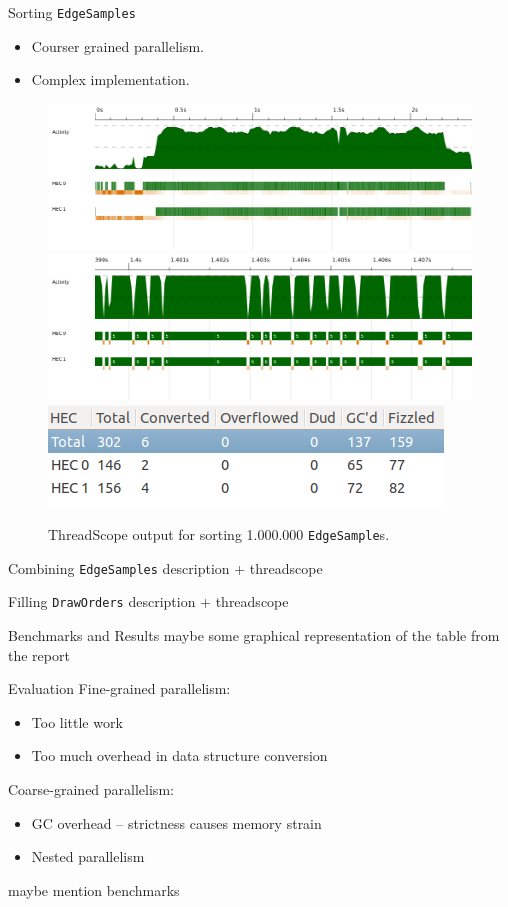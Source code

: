 \documentclass[slidestop,compress,mathserif, xcolor=table]{beamer}
\begin{document}
\begin{frame}[c]{Sorting \texttt{EdgeSamples}}
  \begin{itemize}
  \item Courser grained parallelism.
  \item Complex implementation.
  \end{itemize}
 \begin{figure}[h!]
  \centering
  \includegraphics[width=0.6\linewidth,trim={4cm 2cm 0 0},clip]{../threadscope/sorting/sorting-final}
  \includegraphics[width=0.3\linewidth,trim={8cm 2cm 5cm 0},clip]{../threadscope/sorting/sorting-final-zoom}
  \includegraphics[width=0.25\linewidth]{../threadscope/sorting/sorting-final-sparks}
  \caption{ThreadScope output for sorting 1.000.000 \texttt{EdgeSample}s.}
  \label{fig:sorting-thread}
\end{figure}

\end{frame}

\begin{frame}[c]{Combining \texttt{EdgeSamples}}
description + threadscope
\end{frame}

\begin{frame}[c]{Filling \texttt{DrawOrders}}
description + threadscope
\end{frame}

\begin{frame}[c]{Benchmarks and Results}
maybe some graphical representation of the table from the report
\end{frame}

\begin{frame}[c]{Evaluation}
Fine-grained parallelism:
\begin{itemize}
\item Too little work
\item Too much overhead in data structure conversion
\end{itemize}
\bigskip

Coarse-grained parallelism:
\begin{itemize}
\item GC overhead -- strictness causes memory strain
\item Nested parallelism
\end{itemize}

maybe mention benchmarks
\end{frame}
\end{document}
